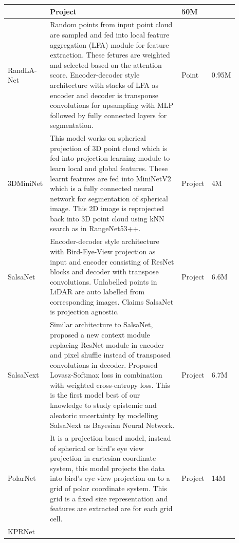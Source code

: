 \begin{longtable}{|p{0.15\linewidth} | p{0.59\linewidth}| p{0.06\linewidth} |p{0.09\linewidth}|}
            & Project & 50M \\
            \hline
            RandLA-Net\cite{Hu_2020_CVPR_Randla} & 
            Random points from input point cloud are sampled and fed into local feature aggregation (LFA) module for feature extraction.
            These fetures are weighted and selected based on the attention score. 
            Encoder-decoder style architecture with stacks of LFA as encoder and decoder is transponse convolutions for upsampling with MLP followed by fully connected layers for segmentation.
            & Point & 0.95M \\
            \hline 
            3DMiniNet\cite{3Dmininet} &
            This model works on spherical projection of 3D point cloud which is fed into projection learning module to learn local and global features.
            These learnt features are fed into MiniNetV2 which is a fully connected neural network for segmentation of spherical image.
            This 2D image is reprojected back into 3D point cloud using kNN search as in RangeNet53++.
            & Project & 4M \\
            \hline
            SalsaNet\cite{salsanet2020} & Encoder-decoder style architecture with Bird-Eye-View projection as input and encoder consisting of ResNet blocks and decoder with transpose convolutions.
            Unlabelled points in LiDAR are auto labelled from corresponding images. Claims SalsaNet is projection agnostic.
            & Project & 6.6M \\
            \hline
            SalsaNext\cite{SalsaNext_2020} & 
            Similar architecture to SalsaNet, proposed a new context module replacing ResNet module in encoder and pixel shuffle instead of transposed convolutions in decoder.
            Proposed Lovasz-Softmax loss in combination with weighted cross-entropy loss.
            This is the first model best of our knowledge to study epistemic and aleatoric uncertainty by modelling SalsaNext as Bayesian Neural Network.
            & Project & 6.7M \\
            \hline
            PolarNet\cite{polarnet} &
            It is a projection based model, instead of spherical or bird's eye view projection in cartesian coordinate system, this model projects the data into bird's eye view projection on to a grid of polar coordinate system.
            This grid is a fixed size representation and features are extracted are for each grid cell.
            & Project & 14M \\
            \hline
            KPRNet\cite{kochanov2020kprnet} &

\end{longtable}
